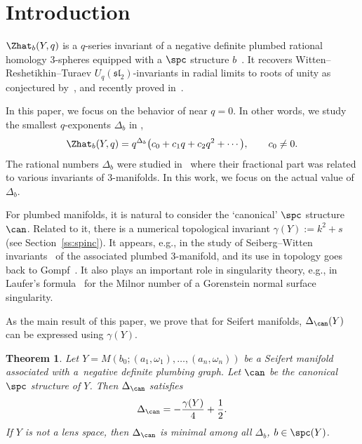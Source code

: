 \documentclass[pdftex]{sigma}
\newtheorem{Theorem}{Theorem}[section]
\begin{document}


\section{Introduction}

$\Zhat_b(Y, q)$ is a $q$-series invariant of a negative definite plumbed rational homology 3-spheres equipped with a $\spc$ structure $b$~\cite{GPPV20}. It recovers Witten--Reshetikhin--Turaev $U_q(\mathfrak{sl}_2)$-invariants in radial limits to roots of unity as conjectured by~\cite{GPPV20}, and recently proved in~\cite{Mur23}.

In this paper, we focus on the behavior of  near $q=0$. In other words, we study the smallest $q$-exponents $\Delta_b$ in ,
\[
 \Zhat_b(Y,q) = q^{\Delta_b}\bigl(c_0+c_1 q + c_2 q^2 + \cdots\bigr), \qquad c_0 \neq 0.
\]
The rational numbers $\Delta_b$ were studied in~\cite{GPP21} where their fractional part was related to various invariants of 3-manifolds. In this work, we focus on the actual value of $\Delta_b$.

For plumbed manifolds, it is natural to consider the `canonical' $\spc$ structure $\can$. Related to it, there is a numerical topological invariant $\gamma(Y) := k^2+s$ (see Section~\ref{ss:spinc}).
It appears, e.g., in the study of Seiberg--Witten invariants~\cite{NeNi02} of the associated plumbed 3-manifold, and its use in topology goes back to Gompf~\cite{Gompf98}. It also plays an important role in singularity theory, e.g., in Laufer's formula~\cite{Laufer1977} for the Milnor number of a Gorenstein normal surface singularity.

As the main result of this paper, we prove that for Seifert manifolds, $\Delta_{\can}(Y)$ can be expressed using $\gamma(Y)$.

\begin{Theorem}\label{thm:seifert_hom}
 Let $Y = M(b_0;(a_1, \omega_1), \dots, (a_n, \omega_n))$ be a Seifert manifold associated with a~negative definite plumbing graph. Let $\can$ be the canonical $\spc$ structure of $Y$. Then $\Delta_{\can}$ satisfies
\begin{gather*}
 \Delta_{\can} = -\frac{\gamma(Y)}{4} + \frac{1}{2}.
\end{gather*}
If $Y$ is not a lens space, then $\Delta_{\can}$ is minimal among all $\Delta_b$, $b \in \spc(Y)$.
\end{Theorem}
\end{document}
